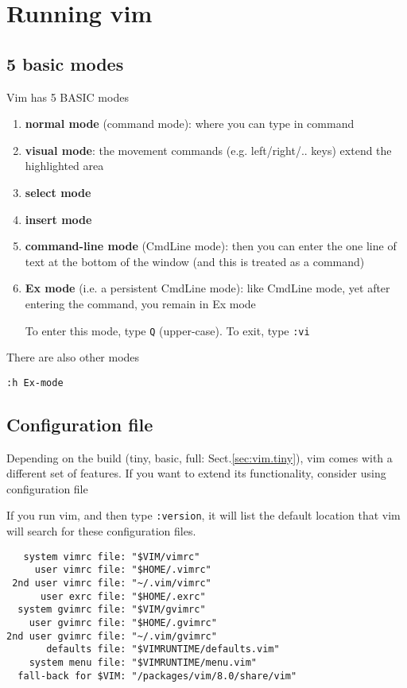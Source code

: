 \section{Running vim}

\subsection{5 basic modes}
\label{sec:modes-in-vim}
\label{sec:vim-modes}

Vim has 5 BASIC modes
\begin{enumerate}
  \item {\bf normal mode} (command mode): where you can type in command
  
  
  \item {\bf visual mode}: the movement commands (e.g. left/right/.. keys)
  extend the highlighted area
  
  \item {\bf select mode}
  
  
  \item {\bf insert mode}
  
  \item {\bf command-line mode} (CmdLine mode): then you can enter the one line
  of text at the bottom of the window (and this is treated as a command)
  
  
  \item {\bf Ex mode} (i.e. a persistent CmdLine mode): like CmdLine mode, yet
  after entering the command, you remain in Ex mode
  
  To enter this mode, type \verb!Q! (upper-case). To exit, type 
  \verb!:vi! 
\end{enumerate}

There are also other modes
\begin{verbatim}
:h Ex-mode

\end{verbatim}

\subsection{Configuration file}
\label{sec:vim-configuration}

Depending on the build (tiny, basic, full: Sect.\ref{sec:vim.tiny}), vim comes
with a different set of features. If you want to extend its functionality,
consider using configuration file

If you run vim, and then type \verb!:version!, it will list the default location
that vim will search for these configuration files.
\begin{verbatim}
   system vimrc file: "$VIM/vimrc"              
     user vimrc file: "$HOME/.vimrc"                    
 2nd user vimrc file: "~/.vim/vimrc"
      user exrc file: "$HOME/.exrc"
  system gvimrc file: "$VIM/gvimrc"
    user gvimrc file: "$HOME/.gvimrc"
2nd user gvimrc file: "~/.vim/gvimrc"
       defaults file: "$VIMRUNTIME/defaults.vim"
    system menu file: "$VIMRUNTIME/menu.vim"
  fall-back for $VIM: "/packages/vim/8.0/share/vim"
\end{verbatim}

